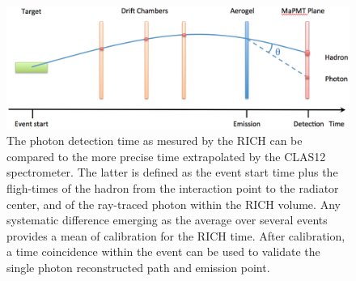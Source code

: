 \documentclass[final,5p,times,twocolumn]{elsarticle}
\begin{document}
\begin{figure}[t]
\begin{center}
\includegraphics[width=1.0\columnwidth]{EPS/Tracking_time.png}
\end{center}
\caption{The photon detection time as mesured by the RICH can be compared to the more precise time extrapolated
by the CLAS12 spectrometer. The latter is defined as the event start time plus the fligh-times of the hadron 
from the interaction point to the radiator center, and of the ray-traced photon within the RICH volume. Any systematic
difference emerging as the average over several events provides a mean of calibration for the RICH time. After calibration,
a time coincidence within the event can be used to validate the single photon reconstructed path and emission point.}
\label{Fig:Traced_Time}
\end{figure}
\end{document}
